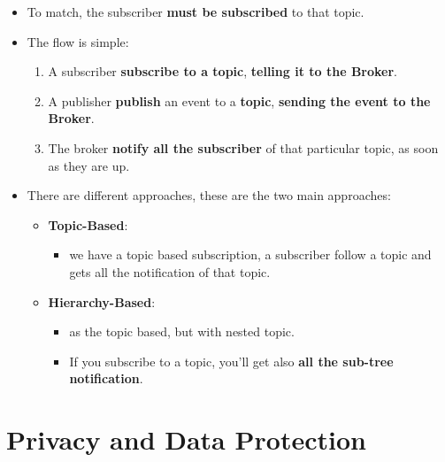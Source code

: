 \documentclass[9pt, letterpaper]{article}
\begin{document}
\begin{itemize}
	\item To match, the subscriber \textbf{must be subscribed} to that topic.
	\item The flow is simple:
	\begin{enumerate}
		\item A subscriber \textbf{subscribe to a topic}, \textbf{telling it to the Broker}.
		\item A publisher \textbf{publish} an event to a \textbf{topic}, \textbf{sending the event to the Broker}.
		\item The broker \textbf{notify all the subscriber} of that particular topic, as soon as they are up.
	\end{enumerate}
	\item There are different approaches, these are the two main approaches:
	\begin{itemize}
		\item \textbf{Topic-Based}:
		\begin{itemize}
		\item we have a topic based subscription, a subscriber follow a topic and gets all the notification of that topic.
		\end{itemize}
		\item \textbf{Hierarchy-Based}: 
		\begin{itemize}
			\item as the topic based, but with nested topic.
			\item If you subscribe to a topic, you'll get also \textbf{all the sub-tree notification}.
		\end{itemize}
	\end{itemize}
\end{itemize}

\newpage

\section{Privacy and Data Protection}
\end{document}
